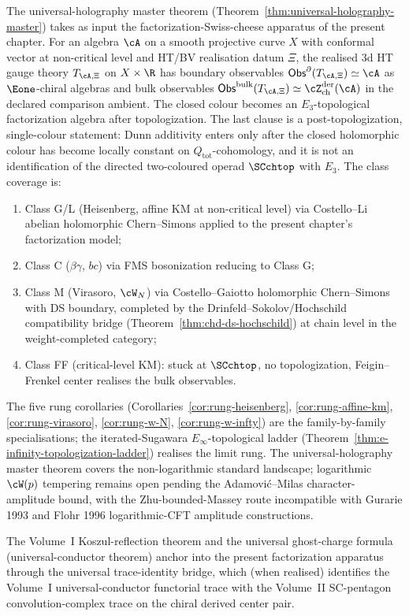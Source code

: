 \begin{remark}
\label{rem:factorization-universal-holography-anchor}%
%
The universal-holography master theorem
(Theorem~\ref{thm:universal-holography-master}) takes as input the
factorization-Swiss-cheese apparatus of the present chapter. For an
algebra $\cA$ on a smooth projective curve $X$ with conformal vector
at non-critical level and HT/BV realisation datum $\Xi$, the realised
3d HT gauge theory $T_{\cA,\Xi}$ on $X \times \R$ has boundary
observables
$\Obs^\partial(T_{\cA,\Xi}) \simeq \cA$ as $\Eone$-chiral algebras and
bulk observables
$\Obs^{\mathrm{bulk}}(T_{\cA,\Xi}) \simeq
\cZ^{\mathrm{der}}_{\mathrm{ch}}(\cA)$ in the declared comparison
ambient. The closed colour becomes an $E_3$-topological factorization
algebra after topologization. The last clause is a
post-topologization, single-colour statement: Dunn additivity enters
only after the closed holomorphic colour has become locally constant
on $Q_{\mathrm{tot}}$-cohomology, and it is not an identification of
the directed two-coloured operad $\SCchtop$ with $E_3$. The
class coverage is:
\begin{enumerate}[label=(\roman*)]
\item Class G/L (Heisenberg, affine KM at non-critical level) via
Costello--Li abelian holomorphic Chern--Simons applied to the present
chapter's factorization model;
\item Class C ($\beta\gamma$, $bc$) via FMS bosonization reducing to
Class G;
\item Class M (Virasoro, $\cW_N$) via Costello--Gaiotto holomorphic
Chern--Simons with DS boundary, completed by the Drinfeld--Sokolov/Hochschild
compatibility bridge (Theorem~\ref{thm:chd-ds-hochschild}) at chain
level in the weight-completed category;
\item Class FF (critical-level KM): stuck at $\SCchtop$, no
topologization, Feigin--Frenkel center realises the bulk observables.
\end{enumerate}
The five rung corollaries (Corollaries~\ref{cor:rung-heisenberg},
\ref{cor:rung-affine-km}, \ref{cor:rung-virasoro},
\ref{cor:rung-w-N}, \ref{cor:rung-w-infty}) are the family-by-family
specialisations; the iterated-Sugawara $E_\infty$-topological ladder
(Theorem~\ref{thm:e-infinity-topologization-ladder}) realises the
limit rung. The universal-holography master theorem covers the
non-logarithmic standard landscape; logarithmic
$\cW(p)$ tempering remains open pending the Adamovi\'c--Milas
character-amplitude bound, with the Zhu-bounded-Massey route
incompatible with Gurarie 1993 and Flohr 1996 logarithmic-CFT
amplitude constructions.

The Volume~I Koszul-reflection theorem and the universal
ghost-charge formula (universal-conductor theorem) anchor into the
present factorization apparatus through the universal trace-identity
bridge, which (when realised) identifies the Volume~I universal-conductor
functorial trace with the Volume~II SC-pentagon convolution-complex
trace on the chiral derived center pair.
\end{remark}

